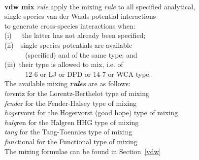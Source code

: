 \begin{tabbing}
\>                                              \> \\
\> {\bf vdw mix}  {\em rule}                    \> apply the mixing {\em rule} to all specified analytical, \\
\>                                              \> single-species van der Waals potential interactions \\
\>                                              \> to generate cross-species interactions when: \\
\>                                              \> \phantom{x} (i)~~~the latter has not already been specified; \\
\>                                              \> \phantom{x} (ii)~~single species potentials are available \\
\>                                              \> \phantom{x} ~~~~~~(specified) and of the same type; and \\
\>                                              \> \phantom{x} (iii)~their type is allowed to mix, i.e. of \\
\>                                              \> \phantom{x} ~~~~~~12-6 or LJ or DPD or 14-7 or WCA type. \\
\>                                              \> The available mixing {\bf \em rule}s are as follows: \\
\>                                              \> \phantom{x} {\em lore}ntz for the Lorentz-Berthelot type of mixing \\
\>                                              \> \phantom{x} {\em fend}er for the Fender-Halsey type of mixing \\
\>                                              \> \phantom{x} {\em hoge}rvorst for the Hogervorst (good hope) type of mixing \\
\>                                              \> \phantom{x} {\em halg}ren for the Halgren HHG type of mixing \\
\>                                              \> \phantom{x} {\em tang} for the Tang-Toennies type of mixing \\
\>                                              \> \phantom{x} {\em func}tional for the Functional type of mixing \\
\>                                              \> The mixing formulae can be found in Section~\ref{vdw} \\
\>                                              \> \\

\end{tabbing}
